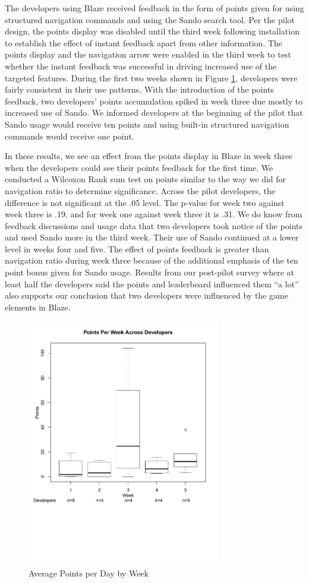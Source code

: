 \documentclass{sig-alternate}
\begin{document}
The developers using Blaze received feedback in the form of points given for using structured navigation commands and using the Sando search tool\cite{Shepherd2012Sando}.  Per the pilot design, the points display was disabled until the third week following installation to establish the effect of instant feedback apart from other information.  The points display and the navigation arrow were enabled in the third week to test whether the instant feedback was successful in driving increased use of the targeted features. During the first two weeks shown in Figure \ref{fig:pointsbyweek}, developers were fairly consistent in their use patterns.  With the introduction of the points feedback, two developers' points accumulation spiked in week three due mostly to increased use of Sando.   We informed developers at the beginning of the pilot that Sando usage would receive ten points and using built-in structured navigation commands would receive one point.  

In these results, we see an effect from the points display in Blaze in week three when the developers could see their points feedback for the first time.  We conducted a Wilcoxon Rank sum test on points similar to the way we did for navigation ratio to determine significance.  Across the pilot developers, the difference is not significant at the .05 level. The p-value for week two against week three is .19, and for week one against week three it is .31.  We do know from feedback discussions and usage data that two developers took notice of the points and used Sando more in the third week.  Their use of Sando continued at a lower level in weeks four and five.   The effect of points feedback is greater than navigation ratio during week three because of the additional emphasis of the ten point bonus given for Sando usage.  Results from our post-pilot survey where at least half the developers said the points and leaderboard influenced them ``a lot'' also supports our conclusion that two developers were influenced by the game elements in Blaze.  

\begin{figure}
	\includegraphics[width=3.3in]{pointsbyweek_ann.pdf}
	\caption{Average Points per Day by Week}
	\label{fig:pointsbyweek}
\end{figure}
\end{document}
